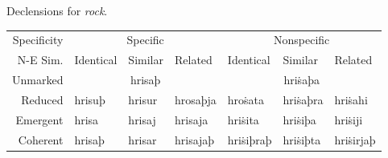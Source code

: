 \documentclass{book}
\begin{document}
\begin{tablenf}
  \caption{Declensions for  \emph{rock}. \label{table:declensionex1}}
  \centering
  \begin{tabular}{r|lll|lll}
    Specificity & \multicolumn{3}{c|}{Specific} & \multicolumn{3}{c}{Nonspecific} \\
    N-E \bs{} Sim. & Identical & Similar & Related & Identical & Similar & Related \\
    \hline
    Unmarked & \multicolumn{3}{c|}{hrisaþ} & \multicolumn{3}{c}{hriṡaþa} \\
    Reduced & hrisuþ & hrisur & hrosaþja & hroṡata & hriṡaþra & hriṡahi \\
    Emergent & hrisa & hrisaj & hrisaja & hriṡita & hriṡiþa & hriṡiji \\
    Coherent & hrisaþ & hrisar & hrisajaþ & hriṡiþraþ & hriṡiþta & hriṡirjaþ \\
  \end{tabular}
\end{tablenf}
\end{document}
